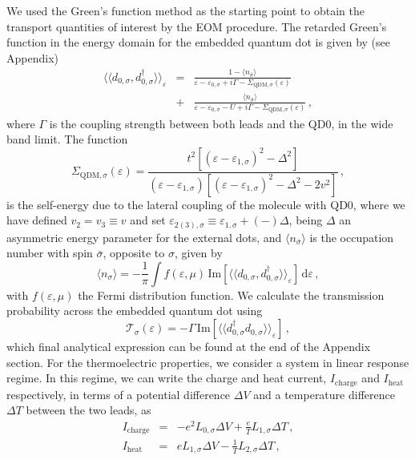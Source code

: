 \documentclass[aps,twocolumn,prb,superscript,floatfix,superscriptaddress,showpacs]{revtex4-1}
\newcommand{\ve}{\varepsilon}
\newcommand{\la}{\langle}
\newcommand{\ra}{\rangle}
\begin{document}
We used the Green's function method as the starting point to obtain the transport quantities of interest by the EOM procedure. The retarded Green's function in the energy domain for the embedded quantum dot is given by (see Appendix)
\begin{eqnarray}
\la\la d_{0,\sigma},d_{0,\sigma}^{\dag} \ra\ra_{\ve} &=& \frac{1-\la n_{\bar{\sigma}}\ra}{\ve-\ve_{0,\sigma}+i\Gamma-\Sigma_{\text{QDM},\sigma}(\ve)} \nonumber \\ \label{green}
&+&\frac{\la n_{\bar{\sigma}}\ra}{\ve-\ve_{0,\sigma}-U+i\Gamma-\Sigma_{\text{QDM},\sigma}(\ve)}\,,
\end{eqnarray}
where $\Gamma$ is the coupling strength between both leads and the QD0, in the wide band limit. The function
\begin{equation}
\Sigma_{\text{QDM},\sigma}(\ve)=\frac{t^{2}\left[(\ve-\ve_{1,\sigma})^{2}-\Delta^{2}\right]}{(\ve-\ve_{1,\sigma})\left[(\ve-\ve_{1,\sigma})^{2}-\Delta^{2}-2v^{2}\right]}\,, \label{Sigma}
\end{equation}
is the self-energy due to the lateral coupling of the molecule with QD0, where we have defined $v_{2}=v_{3}\equiv v$ and set $\ve_{2(3),\sigma}\equiv\ve_{1,\sigma}+(-)\Delta$, being $\Delta$ an asymmetric energy parameter for the external dots, and $\la n_{\bar{\sigma}}\ra$ is the occupation number with spin $\bar{\sigma}$, opposite to $\sigma$, given by
\begin{equation}
\la n_{\sigma} \ra = -\frac{1}{\pi}\int f(\ve,\mu)\,\text{Im}\left[\la\la d_{0,\sigma},d_{0,\sigma}^{\dag} \ra\ra_{\ve}\right]\,\text{d}\ve\,, \label{n}
\end{equation}
with $f(\ve,\mu)$ the Fermi distribution function. We calculate the transmission probability across the embedded quantum dot using
\begin{equation}
\mathcal{T}_{\sigma}(\ve)=-\Gamma\,\text{Im}\left[\la\la d_{0,\sigma}^{\dag}d_{0,\sigma}\ra\ra_{\ve}\right]\,, \label{tras}
\end{equation}
which final analytical expression can be found at the end of the Appendix section.
For the thermoelectric properties, we consider a system in linear response regime. In this regime, we can write the charge and heat current, $I_{\text{charge}}$ and $I_{\text{heat}}$ respectively, in terms of a potential difference $\Delta V$ and a temperature difference $\Delta T$ between the two leads, as\cite{mahanbook}
\begin{eqnarray}
I_{\text{charge}}&=&-e^{2}L_{0,\sigma}\Delta V+\frac{e}{T}L_{1,\sigma}\Delta T\,, \label{Icarga} \\
I_{\text{heat}}&=&e L_{1,\sigma}\Delta V-\frac{1}{T}L_{2,\sigma}\Delta T\,, \label{Iheat}
\end{eqnarray}
\end{document}
